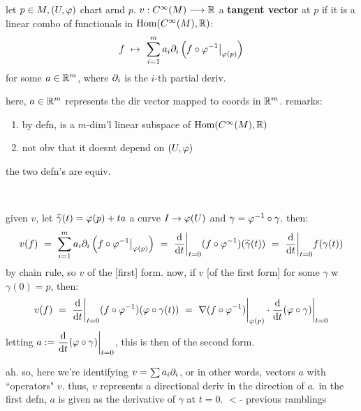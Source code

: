 \begin{defn}
	let $p\in M,(U,\varphi)$ chart arnd $p$. $v:C^{\infty}(M)\longrightarrow\mathbb{R}$ a
	\textbf{tangent vector} at $p$ if it is a linear combo of functionals in $\operatorname{Hom}(C^{\infty}(M),\mathbb{R})$:
	\begin{equation*}
		f \ \mto \ \sum_{i=1}^{m}a_{i}\p_{i}\left(f\circ\vphi^{-1}\big\rvert_{\vphi(p)}\right)
	\end{equation*}
	for some $a\in\mathbb{R}^{m}$, where $\partial_{i}$ is the $i$-th partial deriv.
\end{defn}
here, $a\in\mathbb{R}^{m}$ represents the dir vector mapped to coords in $\mathbb{R}^{m}$.
remarks:
\begin{enumerate}
	\item by defn, is a $m$-dim'l linear subspace of $\operatorname{Hom}(C^{\infty}(M),\mathbb{R})$
	\item not obv that it doesnt depend on $(U,\varphi)$
\end{enumerate}

\begin{thm}
	the two defn's are equiv.
\end{thm} \

\begin{pf}[source=Primary Source Material]
	given $v$, let $\widetilde{\gamma}(t)=\varphi(p)+ta$ a curve $I\rightarrow\varphi(U)$
	and $\gamma=\varphi^{-1}\circ\gamma$. then:
	\begin{equation*}
		v(f)
		\ = \ \sum_{i=1}^{m}a_{i}\p_{i}\left(f\circ\vphi^{-1}\big\rvert_{\vphi(p)}\right)
		\ = \ \frac{\d}{\d t}\bigg\rvert_{t=0}(f\circ\vphi^{-1})(\tilde{\gamma}(t))
		\ = \ \frac{\d}{\d t}\bigg\rvert_{t=0}f(\gamma(t))
	\end{equation*}
	by chain rule, so $v$ of the [first] form.
	now, if $v$ [of the first form] for some $\gamma$ w $\gamma(0)=p$, then:
	\begin{equation*}
		v(f) \ = \ \frac{\d}{\d t}\bigg\rvert_{t=0}(f\circ\vphi^{-1})(\vphi\circ\gamma(t))
		\ = \ \nabla(f\circ\vphi^{-1})\bigg\rvert_{\vphi(p)}\cdot\frac{\d}{\d t}(\vphi\circ\gamma)\bigg\rvert_{t=0}
	\end{equation*}
	letting $a:=\dfrac{\textrm{d}}{\textrm{d} t}(\varphi\circ\gamma)\bigg\rvert_{t=0}$,
	this is then of the second form.
\end{pf}

ah. so, here we're identifying $v=\sum a_{i}\partial_{i}$, or in other words,
vectors $a$ with ``operators" $v$. thus, $v$ represents a directional deriv
in the direction of $a$. in the first defn, $a$ is given as the derivative
of $\gamma$ at $t=0$. $<$- previous ramblings

